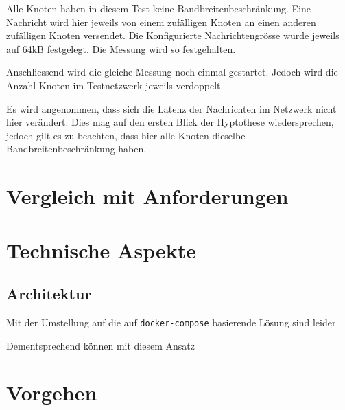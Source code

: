 Alle Knoten haben in diesem Test keine Bandbreitenbeschränkung.
Eine Nachricht wird hier jeweils von einem zufälligen Knoten an einen anderen zufälligen Knoten versendet.
Die Konfigurierte Nachrichtengrösse wurde jeweils auf 64kB festgelegt.
Die Messung wird so festgehalten.

Anschliessend wird die gleiche Messung noch einmal gestartet.
Jedoch wird die Anzahl Knoten im Testnetzwerk jeweils verdoppelt.

Es wird angenommen, dass sich die Latenz der Nachrichten im Netzwerk nicht hier verändert.
Dies mag auf den ersten Blick der Hyptothese wiedersprechen, jedoch gilt es zu beachten, dass hier alle Knoten dieselbe Bandbreitenbeschränkung haben.



\section{}



\section{Vergleich mit Anforderungen}
\label{sec:VergleichAnforderungen}

\seereq{}



\section{Technische Aspekte}

\subsection{Architektur}

Mit der Umstellung auf die auf \lstinline|docker-compose| basierende Lösung sind leider 



Dementsprechend können mit diesem Ansatz

\section{Vorgehen}

